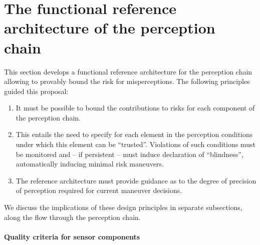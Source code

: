 \section{The functional reference architecture of the perception chain}\label{sec:refarchitecture}
This section develops a functional reference architecture for the perception chain allowing to provably bound the risk for misperceptions. The following principles guided this proposal:
\begin{enumerate}
\item It must be possible to bound the contributions to risks for each component of the perception chain.
\item This entails the need to specify for each element in the perception conditions under which this element can be \enquote{trusted}. Violations of such conditions must be monitored and -- if persistent -- must induce declaration of \enquote{blindness}, automatically inducing minimal risk maneuvers.
\item The reference architecture must provide guidance as to the degree of precision of perception required for current maneuver decisions.
\end{enumerate}
We discuss the implications of these design principles in separate subsections, along the flow through the perception chain.

\paragraph{Quality criteria for sensor components}

